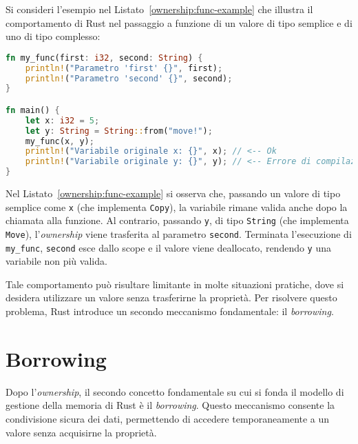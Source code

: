 Si consideri l'esempio nel Listato~\ref{ownership:func-example} che illustra il comportamento di Rust nel passaggio a funzione di un valore di tipo semplice e di uno di tipo complesso:
\begin{lstlisting}[language=Rust, caption={Trasferimento di ownership nelle chiamate a funzione}, label={ownership:func-example}]
fn my_func(first: i32, second: String) {
    println!("Parametro 'first' {}", first);
    println!("Parametro 'second' {}", second);
}

fn main() {
    let x: i32 = 5;
    let y: String = String::from("move!");
    my_func(x, y);
    println!("Variabile originale x: {}", x); // <-- Ok
    println!("Variabile originale y: {}", y); // <-- Errore di compilazione: ownership trasferita
}
\end{lstlisting}
Nel Listato~\ref{ownership:func-example} si osserva che, passando un valore di tipo semplice come \texttt{x} (che implementa \texttt{Copy}), la variabile rimane valida anche dopo la chiamata alla funzione. Al contrario, passando \texttt{y}, di tipo \texttt{String} (che implementa \texttt{Move}), l'\textit{ownership} viene trasferita al parametro \texttt{second}. Terminata l'esecuzione di \texttt{my\_func}, \texttt{second} esce dallo scope e il valore viene deallocato, rendendo \texttt{y} una variabile non più valida.

Tale comportamento può risultare limitante in molte situazioni pratiche, dove si desidera utilizzare un valore senza trasferirne la proprietà. Per risolvere questo problema, Rust introduce un secondo meccanismo fondamentale: il \textit{borrowing}.

\section{Borrowing}
Dopo l'\textit{ownership}, il secondo concetto fondamentale su cui si fonda il modello di gestione della memoria di Rust è il \textit{borrowing}. Questo meccanismo consente la condivisione sicura dei dati, permettendo di accedere temporaneamente a un valore senza acquisirne la proprietà.

